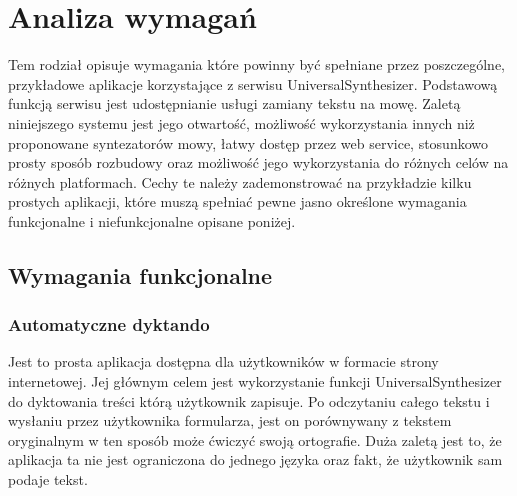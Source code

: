 
\chapter{Analiza wymagań} %



\ifpdf
    \graphicspath{{3/figures/PNG/}{3/figures/PDF/}{3/figures/}}
\else
    \graphicspath{{3/figures/EPS/}{3/figures/}}
\fi


Tem rodział opisuje wymagania które powinny być spełniane przez poszczególne, przykładowe aplikacje korzystające z serwisu UniversalSynthesizer. Podstawową funkcją serwisu jest udostępnianie usługi zamiany tekstu na mowę. Zaletą niniejszego systemu jest jego otwartość, możliwość wykorzystania innych niż proponowane syntezatorów mowy, łatwy dostęp przez web service, stosunkowo prosty sposób rozbudowy oraz możliwość jego wykorzystania do różnych celów na różnych platformach. Cechy te należy zademonstrować na przykładzie kilku prostych aplikacji, które muszą spełniać pewne jasno określone wymagania funkcjonalne i niefunkcjonalne opisane poniżej. 
\section{Wymagania funkcjonalne}

\subsection{Automatyczne dyktando}
Jest to prosta aplikacja dostępna dla użytkowników w formacie strony internetowej. Jej głównym celem jest wykorzystanie funkcji UniversalSynthesizer do dyktowania treści którą użytkownik zapisuje. Po odczytaniu całego tekstu i wysłaniu przez użytkownika formularza, jest on porównywany z tekstem oryginalnym w ten sposób może ćwiczyć swoją ortografie. Duża zaletą jest to, że aplikacja ta nie jest ograniczona do jednego języka oraz fakt, że użytkownik sam podaje tekst.

